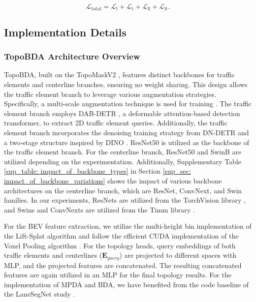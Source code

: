 \begin{equation}
\mathcal{L}_{\text{total}} = \mathcal{L}_{\text{l}} + \mathcal{L}_{\text{t}} + \mathcal{L}_{\text{ll}} + \mathcal{L}_{\text{lt}}.
\end{equation}


\subsection{Implementation Details}
\label{sup_sec: implementation_details}

\subsubsection{TopoBDA Architecture Overview}

TopoBDA, built on the TopoMaskV2 \cite{kalfaoglu2024topomaskv2}, features distinct backbones for traffic elements and centerline branches, ensuring no weight sharing. This design allows the traffic element branch to leverage various augmentation strategies. Specifically, a multi-scale augmentation technique is used for training \cite{zhudeformable}. The traffic element branch employs DAB-DETR \cite{liu2022dabdetr}, a deformable attention-based detection transformer, to extract 2D traffic element queries. Additionally, the traffic element branch incorporates the denoising training strategy from DN-DETR \cite{li2022dn} and a two-stage structure inspired by DINO \cite{zhang2022dino}. ResNet50 is utilized as the backbone of the traffic element branch. For the centerline branch, ResNet50 and SwinB are utilized depending on the experimentation. Additionally, Supplementary Table \ref{sup_table: impact_of_backbone_types} in Section \ref{sup_sec: impact_of_backbone_variations} shows the impact of various backbone architectures on the centerline branch, which are ResNet, ConvNext, and Swin families. In our experiments, ResNets are utilized from the TorchVision library \cite{torchvision2016}, and Swins and ConvNexts are utilized from the Timm library \cite{rw2019timm}.

For the BEV feature extraction, we utilize the multi-height bin implementation of the Lift-Splat algorithm \cite{kalfaoglu2024topomaskv2, philion2020lift} and follow the efficient CUDA implementation of the Voxel Pooling algorithm \cite{huang2022bevpoolv2}. For the topology heads, query embeddings of both traffic elements and centerlines ($\mathbf{E}_{query}$) are projected to different spaces with MLP, and the projected features are concatenated. The resulting concatenated features are again utilized in an MLP for the final topology results. For the implementation of MPDA and BDA, we have benefited from the code baseline of the LaneSegNet study \cite{li2023lanesegnet}. 

